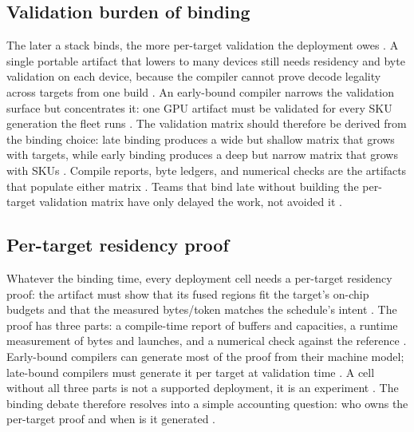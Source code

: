 \subsection{Validation burden of binding}

The later a stack binds, the more per-target validation the deployment owes \citep{iree2024,amd2024aie}. A single portable artifact that lowers to many devices still needs residency and byte validation on each device, because the compiler cannot prove decode legality across targets from one build \citep{memoryfloor2026,patel2025llminference}. An early-bound compiler narrows the validation surface but concentrates it: one GPU artifact must be validated for every SKU generation the fleet runs \citep{nvidia2022hopper,wu2024mirage}. The validation matrix should therefore be derived from the binding choice: late binding produces a wide but shallow matrix that grows with targets, while early binding produces a deep but narrow matrix that grows with SKUs \citep{chen2020compilerbasedhardw,taxbreak2026}. Compile reports, byte ledgers, and numerical checks are the artifacts that populate either matrix \citep{memoryfloor2026,patel2025llminference}. Teams that bind late without building the per-target validation matrix have only delayed the work, not avoided it \citep{iree2024,memoryfloor2026}.

\subsection{Per-target residency proof}

Whatever the binding time, every deployment cell needs a per-target residency proof: the artifact must show that its fused regions fit the target's on-chip budgets and that the measured bytes/token matches the schedule's intent \citep{memoryfloor2026,patel2025llminference,amd2024aie}. The proof has three parts: a compile-time report of buffers and capacities, a runtime measurement of bytes and launches, and a numerical check against the reference \citep{chen2020compilerbasedhardw,memoryfloor2026}. Early-bound compilers can generate most of the proof from their machine model; late-bound compilers must generate it per target at validation time \citep{wu2024mirage,iree2024}. A cell without all three parts is not a supported deployment, it is an experiment \citep{patel2025llminference,taxbreak2026}. The binding debate therefore resolves into a simple accounting question: who owns the per-target proof and when is it generated \citep{memoryfloor2026,chen2020compilerbasedhardw}.

